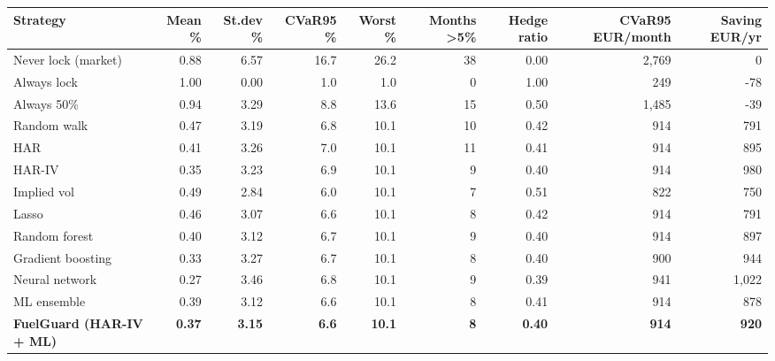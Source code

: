 \begin{tabular}{lrrrrrrrr}
\toprule
Strategy & Mean \% & St.dev \% & CVaR95 \% & Worst \% & Months >5\% & Hedge ratio & CVaR95 EUR/month & Saving EUR/yr \\
\midrule
Never lock (market) & 0.88 & 6.57 & 16.7 & 26.2 & 38 & 0.00 & 2,769 & 0 \\
Always lock & 1.00 & 0.00 & 1.0 & 1.0 & 0 & 1.00 & 249 & -78 \\
Always 50\% & 0.94 & 3.29 & 8.8 & 13.6 & 15 & 0.50 & 1,485 & -39 \\
Random walk & 0.47 & 3.19 & 6.8 & 10.1 & 10 & 0.42 & 914 & 791 \\
HAR & 0.41 & 3.26 & 7.0 & 10.1 & 11 & 0.41 & 914 & 895 \\
HAR-IV & 0.35 & 3.23 & 6.9 & 10.1 & 9 & 0.40 & 914 & 980 \\
Implied vol & 0.49 & 2.84 & 6.0 & 10.1 & 7 & 0.51 & 822 & 750 \\
Lasso & 0.46 & 3.07 & 6.6 & 10.1 & 8 & 0.42 & 914 & 791 \\
Random forest & 0.40 & 3.12 & 6.7 & 10.1 & 9 & 0.40 & 914 & 897 \\
Gradient boosting & 0.33 & 3.27 & 6.7 & 10.1 & 8 & 0.40 & 900 & 944 \\
Neural network & 0.27 & 3.46 & 6.8 & 10.1 & 9 & 0.39 & 941 & 1,022 \\
ML ensemble & 0.39 & 3.12 & 6.6 & 10.1 & 8 & 0.41 & 914 & 878 \\
\textbf{FuelGuard (HAR-IV + ML)} & \textbf{0.37} & \textbf{3.15} & \textbf{6.6} & \textbf{10.1} & \textbf{8} & \textbf{0.40} & \textbf{914} & \textbf{920} \\
\bottomrule
\end{tabular}
